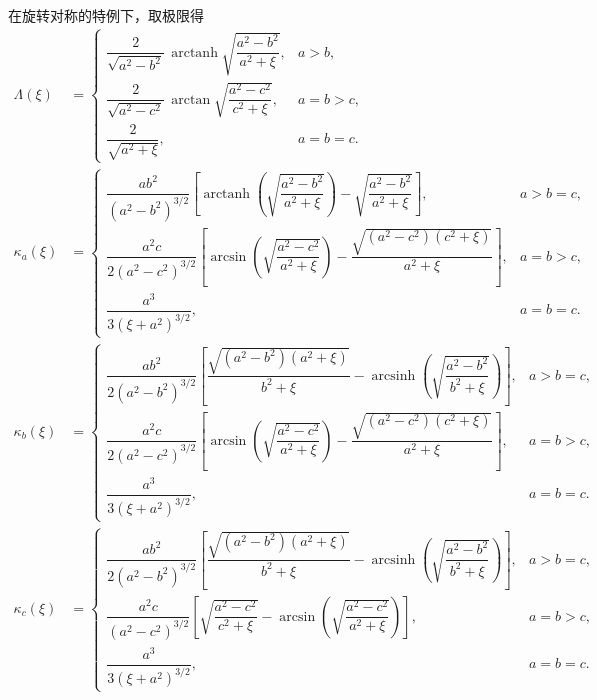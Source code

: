 在旋转对称的特例下，取极限得
\small
\begin{align*}
	\Lambda(\xi)
	&=
	\begin{cases}
		\dfrac{2}{\sqrt{a^{2}-b^{2}}}\,\operatorname{arctanh}
		\!\sqrt{\dfrac{a^{2}-b^{2}}{\,a^{2}+\xi\,}}, & a>b,   \\[8pt]
		\dfrac{2}{\sqrt{a^{2}-c^{2}}}\,\arctan
		\!\sqrt{\dfrac{a^{2}-c^{2}}{\,c^{2}+\xi\,}}, & a=b>c, \\[8pt]
		\dfrac{2}{\sqrt{a^{2}+\xi}},                 & a=b=c.
	\end{cases}\\[6pt]
	\kappa_a(\xi) &=
	\begin{cases}
		\dfrac{a b^2}{(a^2 - b^2)^{3/2}} \left[
			\operatorname{arctanh} \left( \sqrt{\dfrac{a^2 - b^2}{a^2 + \xi}} \right)
			- \sqrt{ \dfrac{a^2 - b^2}{a^2 + \xi} }
		\right],                          & a > b = c, \\[1.5ex]
		\dfrac{a^2 c}{2(a^2 - c^2)^{3/2}} \left[
			\arcsin \left( \sqrt{ \dfrac{a^2 - c^2}{a^2 + \xi} } \right)
			- \dfrac{ \sqrt{ (a^2 - c^2)(c^2 + \xi) } }{ a^2 + \xi }
		\right],                          & a = b > c, \\[1.5ex]
		\dfrac{a^3}{3 (\xi + a^2)^{3/2}}, & a = b = c.
	\end{cases}\\[6pt]
	\kappa_b(\xi) &=
	\begin{cases}
		\dfrac{a b^2}{2(a^2 - b^2)^{3/2}} \left[
			\dfrac{ \sqrt{(a^2 - b^2)(a^2 + \xi)} }{ b^2 + \xi }
			- \operatorname{arcsinh}\left( \sqrt{ \dfrac{a^2 - b^2}{b^2 + \xi} } \right)
		\right],                          & a > b = c, \\[1.5ex]
		\dfrac{a^2 c}{2(a^2 - c^2)^{3/2}} \left[
			\arcsin \left( \sqrt{ \dfrac{a^2 - c^2}{a^2 + \xi} } \right)
			- \dfrac{ \sqrt{(a^2 - c^2)(c^2 + \xi)} }{a^2 + \xi}
		\right],                          & a = b > c, \\[1.5ex]
		\dfrac{a^3}{3 (\xi + a^2)^{3/2}}, & a = b = c.
	\end{cases}\\[6pt]
	\kappa_c(\xi) &=
	\begin{cases}
		\dfrac{a b^2}{2(a^2 - b^2)^{3/2}} \left[
			\dfrac{ \sqrt{(a^2 - b^2)(a^2 + \xi)} }{ b^2 + \xi }
			- \operatorname{arcsinh} \left( \sqrt{ \dfrac{a^2 - b^2}{b^2 + \xi} } \right)
		\right],                          & a > b = c, \\[1.5ex]
		\dfrac{a^2 c}{(a^2 - c^2)^{3/2}} \left[
			\sqrt{ \dfrac{a^2 - c^2}{c^2 + \xi} }
			- \arcsin \left( \sqrt{ \dfrac{a^2 - c^2}{a^2 + \xi} } \right)
		\right],                          & a = b > c, \\[1.5ex]
		\dfrac{a^3}{3 (\xi + a^2)^{3/2}}, & a = b = c.
	\end{cases}
\end{align*}

